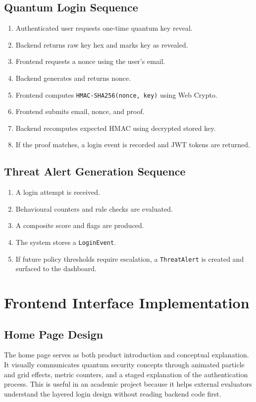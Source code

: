 \subsection{Quantum Login Sequence}
\begin{enumerate}
    \item Authenticated user requests one-time quantum key reveal.
    \item Backend returns raw key hex and marks key as revealed.
    \item Frontend requests a nonce using the user's email.
    \item Backend generates and returns nonce.
    \item Frontend computes \texttt{HMAC-SHA256(nonce, key)} using Web Crypto.
    \item Frontend submits email, nonce, and proof.
    \item Backend recomputes expected HMAC using decrypted stored key.
    \item If the proof matches, a login event is recorded and JWT tokens are returned.
\end{enumerate}

\subsection{Threat Alert Generation Sequence}
\begin{enumerate}
    \item A login attempt is received.
    \item Behavioural counters and rule checks are evaluated.
    \item A composite score and flags are produced.
    \item The system stores a \texttt{LoginEvent}.
    \item If future policy thresholds require escalation, a \texttt{ThreatAlert} is created and surfaced to the dashboard.
\end{enumerate}

\section{Frontend Interface Implementation}

\subsection{Home Page Design}
The home page serves as both product introduction and conceptual explanation. It visually communicates quantum security concepts through animated particle and grid effects, metric counters, and a staged explanation of the authentication process. This is useful in an academic project because it helps external evaluators understand the layered login design without reading backend code first.

